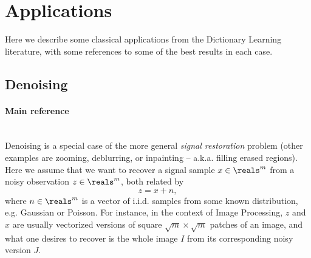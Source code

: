 \documentclass[a4paper]{IEEEtran}
\begin{document}
\section{Applications}

Here we describe some classical applications from the Dictionary Learning literature, with some references to some of the best results in each case.

\subsection{Denoising}

\paragraph{Main reference} \cite{ksvd}\\

Denoising is a special case of the more general \emph{signal restoration} problem (other examples are zooming, deblurring, or inpainting -- a.k.a. filling erased regions). Here we assume that we want to recover a signal sample $x \in \reals^{m}$ from a noisy observation $z \in \reals^{m}$, both related by
\[
z = x + n,
\]
where $n \in \reals^m$ is a vector of i.i.d. samples from some known distribution, e.g. Gaussian or Poisson. For instance, in the context of Image Processing, $z$ and $x$ are usually vectorized versions of square $\sqrt{m}\times\sqrt{m}$ patches of an image, and what one desires to recover is the whole image $I$ from its corresponding noisy version $J$.
\end{document}
